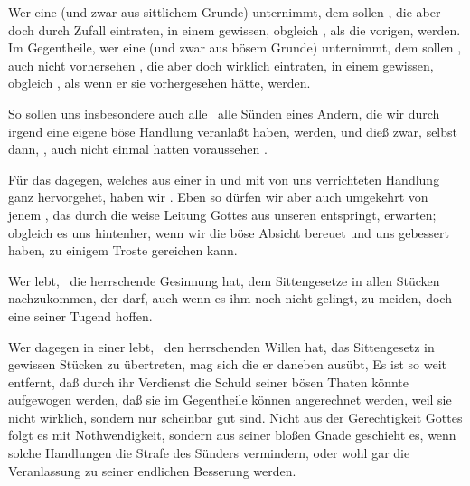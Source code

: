 \begin{aufza}
\item Wer eine  (und zwar aus sittlichem Grunde) unternimmt, dem sollen , die aber doch durch Zufall eintraten, in einem gewissen, obgleich , als die vorigen,  werden. Im Gegentheile, wer eine  (und zwar aus bösem Grunde) unternimmt, dem sollen , auch nicht vorhersehen , die aber doch wirklich eintraten, in einem gewissen, obgleich , als wenn er sie vorhergesehen hätte,  werden.
\item So sollen uns insbesondere auch alle  \dh\ alle Sünden eines Andern, die wir durch irgend eine eigene böse Handlung veranlaßt haben,  werden, und dieß zwar, selbst dann, , auch nicht einmal hatten voraussehen .
\item Für das  dagegen, welches aus einer in  und mit  von uns verrichteten Handlung ganz  hervorgehet, haben wir . Eben so dürfen wir aber auch umgekehrt von jenem , das durch die weise Leitung Gottes aus unseren entspringt,  erwarten; obgleich es uns hintenher, wenn wir die böse Absicht bereuet und uns gebessert haben, zu einigem Troste gereichen kann.
\item Wer  lebt, \dh\ die herrschende Gesinnung hat, dem Sittengesetze in allen Stücken nachzukommen, der darf, auch wenn es ihm noch nicht gelingt,  zu meiden, doch eine seiner Tugend hoffen.
\item Wer dagegen in einer  lebt, \dh\ den herrschenden Willen hat, das Sittengesetz in gewissen Stücken zu übertreten, mag sich  die er daneben ausübt, Es ist so weit entfernt, daß durch ihr Verdienst die Schuld seiner bösen Thaten könnte aufgewogen werden, daß sie im Gegentheile  können angerechnet werden, weil sie nicht wirklich, sondern nur scheinbar gut sind. Nicht aus der Gerechtigkeit Gottes folgt es mit Nothwendigkeit, sondern aus seiner bloßen Gnade geschieht es, wenn solche Handlungen die Strafe des Sünders vermindern, oder wohl gar die Veranlassung zu seiner endlichen Besserung werden.~

\end{aufza}
